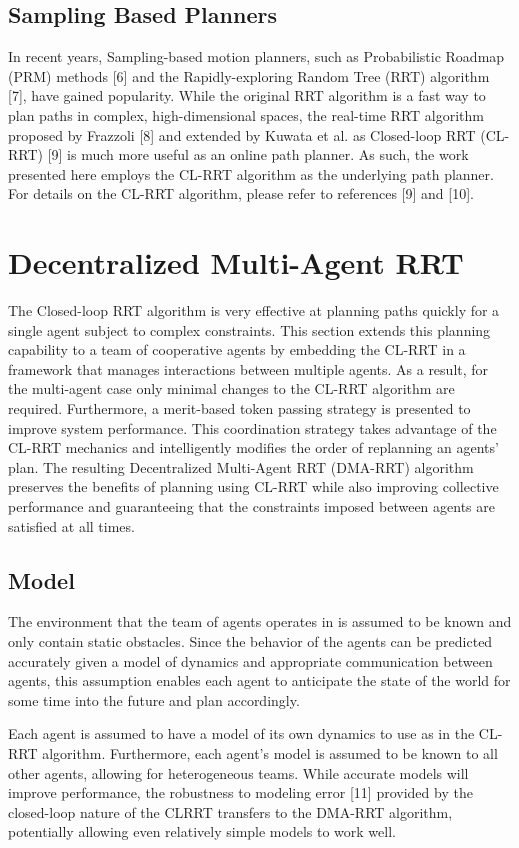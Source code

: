 \documentclass[a4paper]{article}
\begin{document}
\subsection{Sampling Based Planners}
In recent years, Sampling-based motion planners, such as Probabilistic Roadmap (PRM) methods [6] and the Rapidly-exploring Random Tree (RRT) algorithm [7], have gained popularity. While the original RRT algorithm is a fast way to plan paths in complex, high-dimensional spaces, the real-time RRT algorithm proposed by Frazzoli [8] and extended by Kuwata et al. as Closed-loop RRT (CL-RRT) [9] is much more useful as an online path planner. As such, the work presented here employs the CL-RRT algorithm as the underlying path planner. For details on the CL-RRT algorithm, please refer to references [9] and [10].


\section{Decentralized Multi-Agent RRT}
\label{sec:Decentralized Multi-Agent RRT}
The Closed-loop RRT algorithm is very effective at planning paths quickly for a single agent subject to complex constraints. This section extends this planning capability to a team of cooperative agents by embedding the CL-RRT in a framework that manages interactions between multiple agents. As a result, for the multi-agent case only minimal changes to the CL-RRT algorithm are required. Furthermore, a merit-based token passing strategy is presented to improve system performance. This coordination strategy takes advantage of the CL-RRT mechanics and intelligently modifies the order of replanning an agents' plan. The resulting Decentralized Multi-Agent RRT (DMA-RRT) algorithm preserves the benefits of planning using CL-RRT while also improving collective performance and guaranteeing that the constraints imposed between agents are satisfied at all times.

\subsection{Model}
The environment that the team of agents operates in is assumed to be known and only contain static obstacles. Since the behavior of the agents can be predicted accurately given a model of dynamics and appropriate communication between agents, this assumption enables each agent to anticipate the state of the world for some time into the future and plan accordingly.

Each agent is assumed to have a model of its own dynamics to use as in the CL-RRT algorithm. Furthermore, each agent’s model is assumed to be known to all other agents, allowing for heterogeneous teams. While accurate models will improve performance, the robustness to modeling error [11] provided by the closed-loop nature of the CLRRT transfers to the DMA-RRT algorithm, potentially allowing even relatively simple models to work well.
\end{document}

